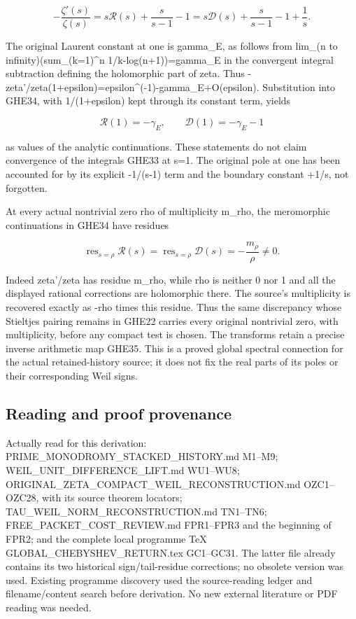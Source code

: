 \[
-\frac{\zeta'(s)}{\zeta(s)}
=s\mathscr R(s)+\frac{s}{s-1}-1
=s\mathscr D(s)+\frac{s}{s-1}-1+\frac1s.
\tag{GHE35}
\]

The original Laurent constant at one is gamma\_E, as follows from
lim\_(n to infinity)(sum\_(k=1)\^{}n 1/k-log(n+1))=gamma\_E in the
convergent integral subtraction defining the holomorphic part of zeta.
Thus -zeta'/zeta(1+epsilon)=epsilon\^{}(-1)-gamma\_E+O(epsilon).
Substitution into GHE34, with 1/(1+epsilon) kept through its constant
term, yields

\[
\mathscr R(1)=-\gamma_E,\qquad
\mathscr D(1)=-\gamma_E-1
\tag{GHE36}
\]

as values of the analytic continuations. These statements do not claim
convergence of the integrals GHE33 at s=1. The original pole at one has
been accounted for by its explicit -1/(s-1) term and the boundary
constant +1/s, not forgotten.

At every actual nontrivial zero rho of multiplicity m\_rho, the
meromorphic continuations in GHE34 have residues

\[
\operatorname{res}_{s=\rho}\mathscr R(s)
=\operatorname{res}_{s=\rho}\mathscr D(s)
=-\frac{m_\rho}{\rho}\ne0.
\tag{GHE37}
\]

Indeed zeta'/zeta has residue m\_rho, while rho is neither 0 nor 1 and
all the displayed rational corrections are holomorphic there. The
source's multiplicity is recovered exactly as -rho times this residue.
Thus the same discrepancy whose Stieltjes pairing remains in GHE22
carries every original nontrivial zero, with multiplicity, before any
compact test is chosen. The transforms retain a precise inverse
arithmetic map GHE35. This is a proved global spectral connection for
the actual retained-history source; it does not fix the real parts of
its poles or their corresponding Weil signs.

\subsection{Reading and proof
provenance}\label{reading-and-proof-provenance}

Actually read for this derivation: PRIME\_MONODROMY\_STACKED\_HISTORY.md
M1--M9; WEIL\_UNIT\_DIFFERENCE\_LIFT.md WU1--WU8;
ORIGINAL\_ZETA\_COMPACT\_WEIL\_RECONSTRUCTION.md OZC1--OZC28, with its
source theorem locators; TAU\_WEIL\_NORM\_RECONSTRUCTION.md TN1--TN6;
FREE\_PACKET\_COST\_REVIEW.md FPR1--FPR3 and the beginning of FPR2; and
the complete local programme TeX GLOBAL\_CHEBYSHEV\_RETURN.tex
GC1--GC31. The latter file already contains its two historical
sign/tail-residue corrections; no obsolete version was used. Existing
programme discovery used the source-reading ledger and filename/content
search before derivation. No new external literature or PDF reading was
needed.

